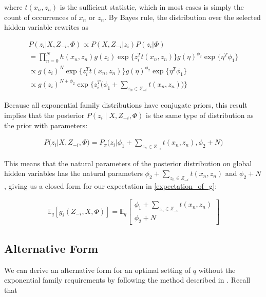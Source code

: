where $t(x_n, z_n)$ is the sufficient statistic, which in most cases is simply the count of occurrences of $x_n$ or $z_n$. By Bayes rule, the distribution over the selected hidden variable rewrites as  

\begin{align}
\nonumber P(z_i | X, Z_{-i}, \Phi) \propto P(X,Z_{-i} | z_i)P(z_i|\Phi) \\
\nonumber = \prod\limits_{n=0}^N  h(x_n, z_n) g(z_i)\exp\big\{z_i^T t(x_n, z_n)\big\}  g(\eta)^{\phi_2}\exp\big\{\eta^T\phi_1 \big\} \\
\nonumber \propto g(z_i)^N \exp\big\{z_i^T t(x_n, z_n)\big\}  g(\eta)^{\phi_2}\exp\big\{\eta^T\phi_1 \big\} \\
\propto g(z_i)^{N+\phi_2} \exp\bigg\{z_i^T \big(\phi_1 + \sum\limits_{z_n \in Z_{-i}} t(x_n, z_n)\big)\bigg\}
\end{align}

Because all exponential family distributions have conjugate priors, this result implies that the posterior $P(z_i \mid X, Z_{-i}, \Phi)$ is the same type of distribution as the prior with parameters:

\begin{align}
P(z_i | X,Z_{-i},\Phi) = P_{\pi}\big(z_i | \phi_1 + \sum\limits_{z_n \in Z_{-i}} t(x_n, z_n), \phi_2 + N\big)
\end{align}

This means that the natural parameters of the posterior distribution on global hidden variables has the natural parameters $\phi_2 + \sum\limits_{z_n \in Z_{-i}} t(x_n, z_n)$ and $\phi_2 + N$, giving us a closed form for our expectation in \eqref{expectation_of_g}: 

\begin{align}
\mathbb{E}_q[g_i(Z_{-i}, X, \Phi)] = \mathbb{E}_q \begin{bmatrix} \phi_1 + \sum\limits_{z_n \in Z_{-i}} t(x_n, z_n) \\ \phi_2 + N \end{bmatrix}
\end{align}

\citep{hoffman:2013}



\subsection{Alternative Form}
We can derive an alternative form for an optimal setting of $q$ without the exponential family requirements by following the method described in \citet{bishop:2006}. Recall that 

